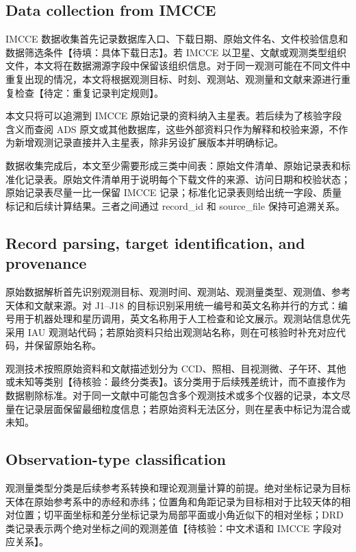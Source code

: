 \documentclass{aastex701}
\begin{document}
\subsection{Data collection from IMCCE} \label{subsec:data_collection}

IMCCE 数据收集首先记录数据库入口、下载日期、原始文件名、文件校验信息和数据筛选条件【待填：具体下载日志】。若 IMCCE 以卫星、文献或观测类型组织文件，本文将在数据溯源字段中保留该组织信息。对于同一观测可能在不同文件中重复出现的情况，本文将根据观测目标、时刻、观测站、观测量和文献来源进行重复检查【待定：重复记录判定规则】。

本文只将可以追溯到 IMCCE 原始记录的资料纳入主星表。若后续为了核验字段含义而查阅 ADS 原文或其他数据库，这些外部资料只作为解释和校验来源，不作为新增观测记录直接并入主星表，除非另设扩展版本并明确标记。

数据收集完成后，本文至少需要形成三类中间表：原始文件清单、原始记录表和标准化记录表。原始文件清单用于说明每个下载文件的来源、访问日期和校验状态；原始记录表尽量一比一保留 IMCCE 记录；标准化记录表则给出统一字段、质量标记和后续计算结果。三者之间通过 record\_id 和 source\_file 保持可追溯关系。

\subsection{Record parsing, target identification, and provenance} \label{subsec:parse}

原始数据解析首先识别观测目标、观测时间、观测站、观测量类型、观测值、参考天体和文献来源。对 J1--J18 的目标识别采用统一编号和英文名称并行的方式：编号用于机器处理和星历调用，英文名称用于人工检查和论文展示。观测站信息优先采用 IAU 观测站代码；若原始资料只给出观测站名称，则在可核验时补充对应代码，并保留原始名称。

观测技术按照原始资料和文献描述划分为 CCD、照相、目视测微、子午环、其他或未知等类别【待核验：最终分类表】。该分类用于后续残差统计，而不直接作为数据剔除标准。对于同一文献中可能包含多个观测技术或多个仪器的记录，本文尽量在记录层面保留最细粒度信息；若原始资料无法区分，则在星表中标记为混合或未知。

\subsection{Observation-type classification} \label{subsec:classification}

观测量类型分类是后续参考系转换和理论观测量计算的前提。绝对坐标记录为目标天体在原始参考系中的赤经和赤纬；位置角和角距记录为目标相对于比较天体的相对位置；切平面坐标和差分坐标记录为局部平面或小角近似下的相对坐标；DRD 类记录表示两个绝对坐标之间的观测差值【待核验：中文术语和 IMCCE 字段对应关系】。
\end{document}
